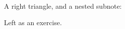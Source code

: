 \begin{note}[Pythagoras]
A right triangle, and a nested subnote:

\begin{subnote}
Left as an exercise.
\end{subnote}
\end{note}

